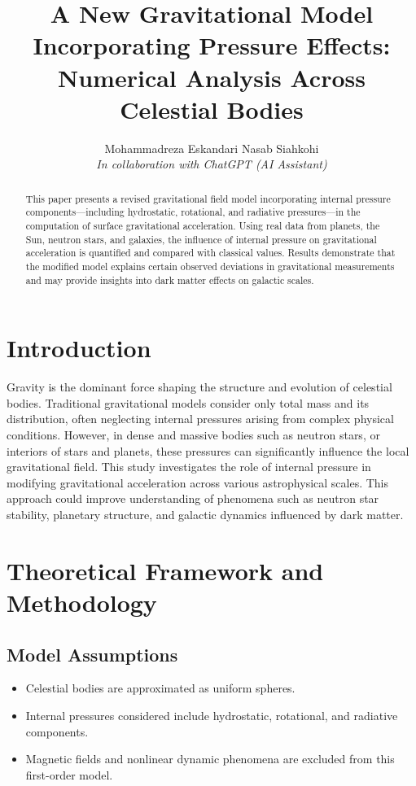 \documentclass[12pt,a4paper]{article}
\title{A New Gravitational Model Incorporating Pressure Effects: Numerical Analysis Across Celestial Bodies}
\author{Mohammadreza Eskandari Nasab Siahkohi \\
\textit{In collaboration with ChatGPT (AI Assistant)}}
\date{}
\begin{document}
\maketitle

\begin{abstract}
This paper presents a revised gravitational field model incorporating internal pressure components—including hydrostatic, rotational, and radiative pressures—in the computation of surface gravitational acceleration. Using real data from planets, the Sun, neutron stars, and galaxies, the influence of internal pressure on gravitational acceleration is quantified and compared with classical values. Results demonstrate that the modified model explains certain observed deviations in gravitational measurements and may provide insights into dark matter effects on galactic scales.
\end{abstract}

\section{Introduction}
Gravity is the dominant force shaping the structure and evolution of celestial bodies. Traditional gravitational models consider only total mass and its distribution, often neglecting internal pressures arising from complex physical conditions. However, in dense and massive bodies such as neutron stars, or interiors of stars and planets, these pressures can significantly influence the local gravitational field. This study investigates the role of internal pressure in modifying gravitational acceleration across various astrophysical scales. This approach could improve understanding of phenomena such as neutron star stability, planetary structure, and galactic dynamics influenced by dark matter.

\section{Theoretical Framework and Methodology}
\subsection{Model Assumptions}
\begin{itemize}
    \item Celestial bodies are approximated as uniform spheres.
    \item Internal pressures considered include hydrostatic, rotational, and radiative components.
    \item Magnetic fields and nonlinear dynamic phenomena are excluded from this first-order model.
\end{itemize}
\end{document}
